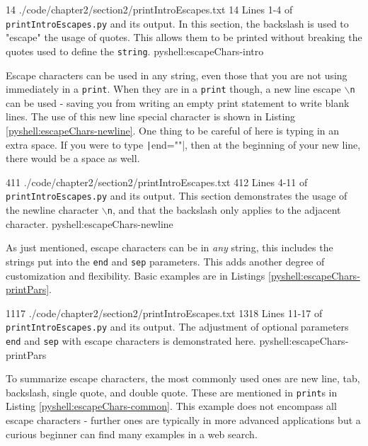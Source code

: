 \documentclass[oneside]{book}
\begin{document}
{1}{4}
{./code/chapter2/section2/printIntroEscapes.txt}
{1}{4}
{Lines 1-4 of \texttt{printIntroEscapes.py} and its output. In this section, the backslash is used to "escape" the usage of quotes. This allows them to be printed without breaking the quotes used to define the \texttt{string}.}
{pyshell:escapeChars-intro}

Escape characters can be used in any string, even those that you are not using immediately in a \texttt{print}. When they are in a \texttt{print} though, a new line escape \texttt{$\backslash$n} can be used - saving you from writing an empty print statement to write blank lines. The use of this new line special character is shown in Listing \ref{pyshell:escapeChars-newline}. One thing to be careful of here is typing in an extra space. If you were to type \texttt|end="\n "|, then at the beginning of your new line, there would be a space as well.
    
{4}{11}
{./code/chapter2/section2/printIntroEscapes.txt}
{4}{12}
{Lines 4-11 of \texttt{printIntroEscapes.py} and its output. This section demonstrates the usage of the newline character \texttt{$\backslash$n}, and that the backslash only applies to the adjacent character.}
{pyshell:escapeChars-newline}

As just mentioned, escape characters can be in \emph{any} string, this includes the strings put into the \texttt{end} and \texttt{sep} parameters. This adds another degree of customization and flexibility. Basic examples are in Listings \ref{pyshell:escapeChars-printPars}.
    
{11}{17}
{./code/chapter2/section2/printIntroEscapes.txt}
{13}{18}
{Lines 11-17 of \texttt{printIntroEscapes.py} and its output. The adjustment of optional parameters \texttt{end} and \texttt{sep} with escape characters is demonstrated here.}
{pyshell:escapeChars-printPars}

To summarize escape characters, the most commonly used ones are new line, tab, backslash, single quote, and double quote. These are mentioned in \texttt{print}s in Listing \ref{pyshell:escapeChars-common}. This example does not encompass all escape characters - further ones are typically in more advanced applications but a curious beginner can find many examples in a web search.
    
\end{document}
